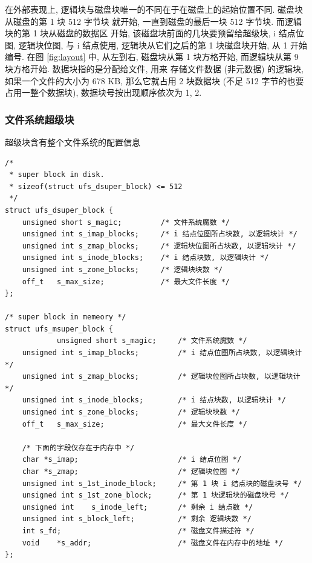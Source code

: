 \documentclass[nofonts, titlepage]{ctexart}
\begin{document}
在外部表现上, 逻辑块与磁盘块唯一的不同在于在磁盘上的起始位置不同.
磁盘块从磁盘的第 1 块 512 字节块 就开始, 一直到磁盘的最后一块 512
字节块. 而逻辑块的第 1 块从磁盘的数据区 开始,
该磁盘块前面的几块要预留给超级块, i 结点位图, 逻辑块位图, 与 i 结点使用,
逻辑块从它们之后的第 1 块磁盘块开始,
从 1 开始编号. 在图 \ref{fig:layout} 中,
从左到右,
磁盘块从第 1 块方格开始, 而逻辑块从第 9 块方格开始.
数据块指的是分配给文件, 用来 存储文件数据 (非元数据) 的逻辑块,
如果一个文件的大小为 678 KB, 那么它就占用 2 块数据块 (不足 512 字节的也要
占用一整个数据块), 数据块号按出现顺序依次为 1, 2.

\subsubsection{文件系统超级块}\label{ux6587ux4ef6ux7cfbux7edfux8d85ux7ea7ux5757}

超级块含有整个文件系统的配置信息

\begin{verbatim}
/*
 * super block in disk.
 * sizeof(struct ufs_dsuper_block) <= 512
 */
struct ufs_dsuper_block {
    unsigned short s_magic;         /* 文件系统魔数 */
    unsigned int s_imap_blocks;     /* i 结点位图所占块数, 以逻辑块计 */
    unsigned int s_zmap_blocks;     /* 逻辑块位图所占块数, 以逻辑块计 */
    unsigned int s_inode_blocks;    /* i 结点块数, 以逻辑块计 */
    unsigned int s_zone_blocks;     /* 逻辑块块数 */
    off_t   s_max_size;             /* 最大文件长度 */
};

/* super block in memeory */
struct ufs_msuper_block {
            unsigned short s_magic;     /* 文件系统魔数 */
    unsigned int s_imap_blocks;         /* i 结点位图所占块数, 以逻辑块计 */
    unsigned int s_zmap_blocks;         /* 逻辑块位图所占块数, 以逻辑块计 */
    unsigned int s_inode_blocks;        /* i 结点块数, 以逻辑块计 */
    unsigned int s_zone_blocks;         /* 逻辑块块数 */
    off_t   s_max_size;                 /* 最大文件长度 */

    /* 下面的字段仅存在于内存中 */
    char *s_imap;                       /* i 结点位图 */
    char *s_zmap;                       /* 逻辑块位图 */
    unsigned int s_1st_inode_block;     /* 第 1 块 i 结点块的磁盘块号 */
    unsigned int s_1st_zone_block;      /* 第 1 块逻辑块的磁盘块号 */
    unsigned int    s_inode_left;       /* 剩余 i 结点数 */
    unsigned int s_block_left;          /* 剩余 逻辑块数 */
    int s_fd;                           /* 磁盘文件描述符 */
    void    *s_addr;                    /* 磁盘文件在内存中的地址 */
};
\end{verbatim}
\end{document}
